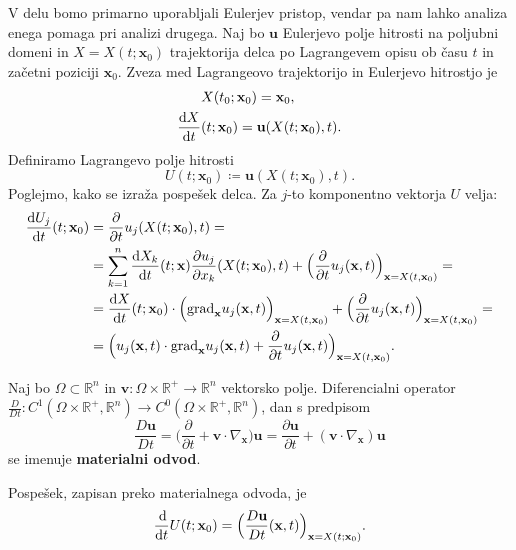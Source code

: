 \documentclass[mat2, tisk]{fmfdelo}
\newcommand{\R}{\mathbb R}
\newcommand{\bd}{\textbf}
\begin{document}
V delu bomo primarno uporabljali Eulerjev pristop, vendar pa nam lahko analiza enega pomaga
pri analizi drugega. Naj bo $\bd{u}$ Eulerjevo polje hitrosti na poljubni domeni in $X = X(t; \bd{x}_0)$ trajektorija delca 
po Lagrangevem opisu ob času $t$ in začetni poziciji $\bd{x}_0$. 
Zveza med Lagrangeovo trajektorijo in Eulerjevo hitrostjo je 
\begin{align}
&X(t_0; \bd{x}_0) = \bd{x}_0, \\
\label{eq:euler-lagrange}
\frac{\dif X}{\dif t}&(t; \bd{x}_0) = \bd{u}(X(t; \bd{x}_0), t).
\end{align}
Definiramo Lagrangevo polje hitrosti
\begin{equation}
U(t; \bd{x}_0) \coloneqq \bd{u}(X(t; \bd{x}_0), t).
\end{equation}
Poglejmo, kako se izraža pospešek delca. Za $j$-to komponentno vektorja $U$ velja:
\begin{align*}
\frac{\dif U_j}{\dif t}(t; \bd{x}_0) &= \frac{\partial}{\partial t} u_j(X(t; \bd{x}_0), t) = \\
&= \sum_{k=1}^n \frac{\dif X_k}{\dif t}(t; \bd{x}) \frac{\partial u_j}{\partial x_k}(X(t; \bd{x}_0), t) + \Big(\frac{\partial}{\partial t} u_j(\bd{x}, t) \Big)_{\bd{x} = X(t, \bd{x}_0)} = \\
&= \frac{\dif X}{\dif t}(t; \bd{x}_0) \cdot \Big(\text{grad}_\bd{x} u_j(\bd{x}, t) \Big)_{\bd{x} = X(t, \bd{x}_0)} + \Big(\frac{\partial}{\partial t} u_j(\bd{x}, t) \Big)_{\bd{x} = X(t, \bd{x}_0)} = \\
&= \Big(u_j(\bd{x}, t) \cdot \text{grad}_\bd{x} u_j(\bd{x}, t) + \frac{\partial}{\partial t} u_j(\bd{x}, t) \Big)_{\bd{x} = X(t, \bd{x}_0)}.
\end{align*}

\newpage
\begin{definicija}
Naj bo $\Omega \subset \R^n$ in $\bd{v}: \Omega\times \R^+ \rightarrow \R^n$ vektorsko polje. Diferencialni operator 
$\frac{D}{D t}: C^1(\Omega \times \R^+, \R^n) \rightarrow C^0(\Omega \times \R^+, \R^n)$, dan s predpisom
\begin{equation}
\frac{D \bd{u}}{Dt} = \Big(\frac{\partial}{\partial t} + \bd{v} \cdot \nabla_\bd{x}\Big) \bd{u} = \frac{\partial \bd{u}}{\partial t} + (\bd{v}\cdot \nabla_\bd{x}) \bd{u}
\end{equation}
se imenuje \textbf{materialni odvod}.
\end{definicija}

Pospešek, zapisan preko materialnega odvoda, je 
\begin{equation}
\frac{\dif}{\dif t} U(t; \bd{x}_0) = \Big(\frac{D \bd{u}}{Dt}(\bd{x}, t) \Big)_{\bd{x} = X(t; \bd{x}_0)}.
\end{equation}
\end{document}
